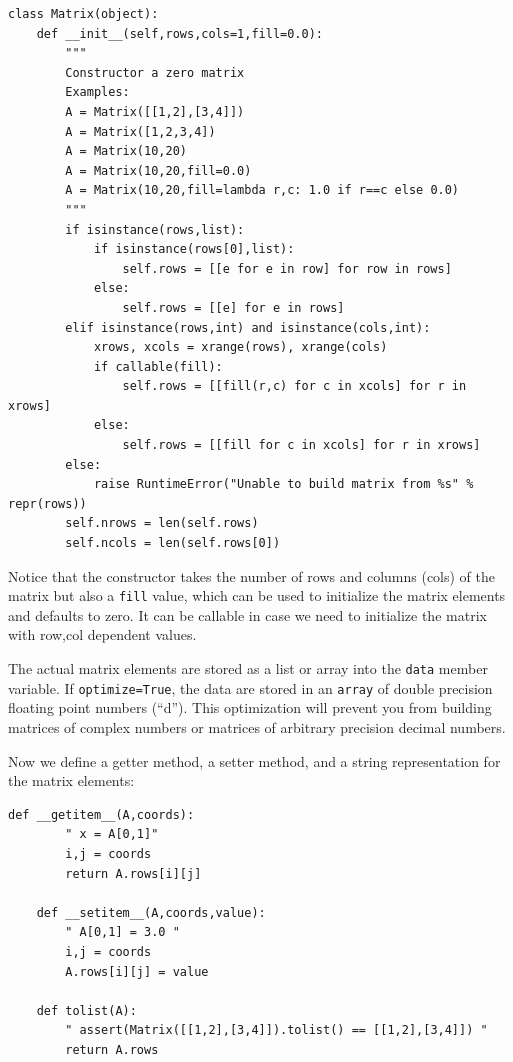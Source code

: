 \documentclass[justified,sixbynine]{tufte-book}
\def\ft{\small\tt}
\theoremstyle{plain}%
\theoremstyle{definition}
\theoremstyle{remark}
\begin{document}
\begin{fullwidth}

\begin{lstlisting}[caption={in file: {\ft nlib.py}}]
class Matrix(object):
    def __init__(self,rows,cols=1,fill=0.0):
        """
        Constructor a zero matrix
        Examples:
        A = Matrix([[1,2],[3,4]])
        A = Matrix([1,2,3,4])
        A = Matrix(10,20)
        A = Matrix(10,20,fill=0.0)
        A = Matrix(10,20,fill=lambda r,c: 1.0 if r==c else 0.0)
        """
        if isinstance(rows,list):
            if isinstance(rows[0],list):
                self.rows = [[e for e in row] for row in rows]
            else:
                self.rows = [[e] for e in rows]
        elif isinstance(rows,int) and isinstance(cols,int):
            xrows, xcols = xrange(rows), xrange(cols)
            if callable(fill):
                self.rows = [[fill(r,c) for c in xcols] for r in xrows]
            else:
                self.rows = [[fill for c in xcols] for r in xrows]
        else:
            raise RuntimeError("Unable to build matrix from %s" % repr(rows))
        self.nrows = len(self.rows)
        self.ncols = len(self.rows[0])
\end{lstlisting}

Notice that the constructor takes the number of rows and columns (cols) of the matrix but also a {\ft fill} value, which can be used to initialize the matrix elements and defaults to zero. It can be callable in case we need to initialize the matrix with row,col dependent values.

The actual matrix elements are stored as a list or array into the {\ft data} member variable. If {\ft optimize=True}, the data are stored in an {\ft array} of double precision floating point numbers (``d''). This optimization will prevent you from building matrices of complex numbers or matrices of arbitrary precision decimal numbers.

Now we define a getter method, a setter method, and a string representation for the matrix elements:

\begin{lstlisting}[caption={in file: {\ft nlib.py}}]
    def __getitem__(A,coords):
        " x = A[0,1]"
        i,j = coords
        return A.rows[i][j]

    def __setitem__(A,coords,value):
        " A[0,1] = 3.0 "
        i,j = coords
        A.rows[i][j] = value

    def tolist(A):
        " assert(Matrix([[1,2],[3,4]]).tolist() == [[1,2],[3,4]]) "
        return A.rows


\end{lstlisting}
\end{fullwidth}
\end{document}
